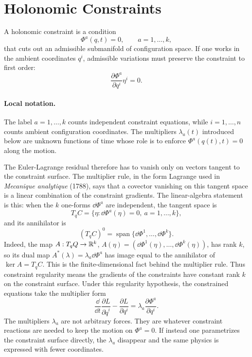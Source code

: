 \section{Holonomic Constraints}
\label{sec:holonomic-constraints}

A holonomic constraint is a condition
\[
  \Phi^a(q,t)=0,\qquad a=1,\ldots,k,
\]
that cuts out an admissible submanifold of configuration space. If one works in
the ambient coordinates \(q^i\), admissible variations must preserve the
constraint to first order:
\[
  \frac{\partial\Phi^a}{\partial q^i}\eta^i=0.
\]

\paragraph{Local notation.}
The label \(a=1,\ldots,k\) counts independent constraint equations, while
\(i=1,\ldots,n\) counts ambient configuration coordinates.  The multipliers
\(\lambda_a(t)\) introduced below are unknown functions of time whose role is
to enforce \(\Phi^a(q(t),t)=0\) along the motion.

The Euler-Lagrange residual therefore has to vanish only on vectors tangent to
the constraint surface. The multiplier rule, in the form Lagrange used in
\emph{Mecanique analytique} (1788), says that a covector
vanishing on this tangent space is a linear combination of the constraint
gradients. The linear-algebra statement is this: when the \(k\) one-forms
\(\dd\Phi^a\) are independent, the tangent space is
\[
  T_qC=\{\eta:\dd\Phi^a(\eta)=0,\ a=1,\ldots,k\},
\]
and its annihilator is
\[
  (T_qC)^0=\operatorname{span}\{\dd\Phi^1,\ldots,\dd\Phi^k\}.
\]
Indeed, the map \(A:T_qQ\to\mathbb{R}^k\), \(A(\eta)=(\dd\Phi^1(\eta),\ldots,
\dd\Phi^k(\eta))\), has rank \(k\), so its dual map
\(A^*(\lambda)=\lambda_a\dd\Phi^a\) has image equal to the annihilator of
\(\ker A=T_qC\). This is the finite-dimensional fact behind the multiplier
rule.
Thus constraint regularity means the gradients of the constraints have
constant rank \(k\) on the constraint surface. Under this regularity hypothesis,
the constrained equations take the multiplier form
\[
  \frac{\dd}{\dd t}\frac{\partial L}{\partial \dot q^i}
  -
  \frac{\partial L}{\partial q^i}
  =
  \lambda_a\frac{\partial \Phi^a}{\partial q^i}.
\]
The multipliers \(\lambda_a\) are not arbitrary forces. They are whatever
constraint reactions are needed to keep the motion on \(\Phi^a=0\). If instead
one parametrizes the constraint surface directly, the \(\lambda_a\) disappear
and the same physics is expressed with fewer coordinates.

